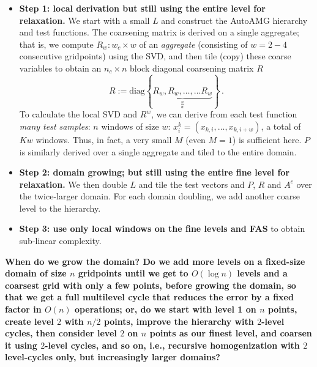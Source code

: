 \documentclass{article}
\begin{document}
\begin{itemize}
\item {\bf Step 1: local derivation but still using the entire level for relaxation.}
We start with a small $L$ and construct the AutoAMG hierarchy and test functions. The coarsening matrix is derived on a single aggregate; that is, we compute $R_w: w_c \times w$ of an \emph{aggregate} (consisting of $w = 2-4$ consecutive gridpoints) using the SVD, and then  tile (copy) these coarse variables to obtain an $n_c \times n$ block diagonal coarsening matrix $R$
\begin{equation}
	R := \text{diag} \left\{ \underbrace{R_w, R_w, \dots, ... R_w }_{\frac{n}{w}}  \right\} \,.
\end{equation}
To calculate the local SVD and $R^w$, we can derive from each test function \emph{many test samples}: $n$ windows of size $w$: $x^k_i = (x_{k,i},\dots,x_{k,i+w})$, a total of $Kw$ windows. Thus, in fact, a very small $M$ (even $M=1$) is sufficient here. $P$ is similarly derived over a single aggregate and tiled to the entire domain.

\item {\bf Step 2: domain growing; but still using the entire fine level for relaxation.} We then double $L$ and tile the test vectors and $P$, $R$ and $A^c$ over the twice-larger domain. For each domain doubling, we add another coarse level to the hierarchy. 

\item {\bf Step 3: use only local windows on the fine levels and FAS} to obtain sub-linear complexity.
\end{itemize}

{\bf When do we grow the domain? Do we add more levels on a fixed-size domain of size $n$ gridpoints until we get to $O(\log n)$ levels and a coarsest grid with only a few points, before growing the domain, so that we get a full multilevel cycle that reduces the error by a fixed factor in $O(n)$ operations; or, do we start with level 1 on $n$ points, create level $2$ with $n/2$ points, improve the hierarchy with $2$-level cycles, then consider level $2$ on $n$ points as our finest level, and coarsen it using $2$-level cycles, and so on, i.e., recursive homogenization with $2$ level-cycles only, but increasingly larger domains?}
\end{document}
